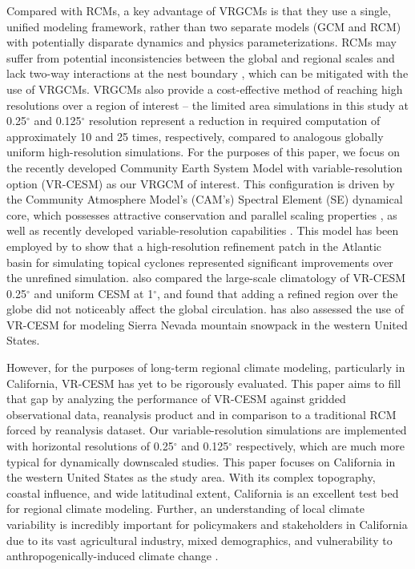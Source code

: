 \documentclass[draft,ms]{agutex}   %
\begin{document}
\begin{article}
Compared with RCMs, a key advantage of VRGCMs is that they use a single, unified modeling framework, rather than two separate models (GCM and RCM) with potentially disparate dynamics and physics parameterizations. RCMs may suffer from potential inconsistencies between the global and regional scales and lack two-way interactions at the nest boundary \citep{warner1997tutorial, mcdonald2003transparent, laprise2008challenging, mesinger2013limited}, which can be mitigated with the use of VRGCMs. VRGCMs also provide a cost-effective method of reaching high resolutions over a region of interest -- the limited area simulations in this study at 0.25$^\circ$ and 0.125$^\circ$ resolution represent a reduction in required computation of approximately 10 and 25 times, respectively, compared to analogous globally uniform high-resolution simulations. For the purposes of this paper, we focus on the recently developed Community Earth System Model with variable-resolution option (VR-CESM) as our VRGCM of interest. This configuration is driven by the Community Atmosphere Model's (CAM's) Spectral Element (SE) dynamical core, which possesses attractive conservation and parallel scaling properties \citep{dennis2011cam, taylor2011conservation}, as well as recently developed variable-resolution capabilities \citep{zarzycki2014aquaplanet, zarzycki2015experimental}. This model has been employed by \cite{zarzycki2014using} to show that a high-resolution refinement patch in the Atlantic basin for simulating topical cyclones represented significant improvements over the unrefined simulation. \cite{zarzycki2015effects} also compared the large-scale climatology of VR-CESM 0.25$^\circ$ and uniform CESM at 1$^\circ$, and found that adding a refined region over the globe did not noticeably affect the global circulation. \cite{Rhoades2015Characterizing} has also assessed the use of VR-CESM for modeling Sierra Nevada mountain snowpack in the western United States.


However, for the purposes of long-term regional climate modeling, particularly in California, VR-CESM has yet to be rigorously evaluated. This paper aims to fill that gap by analyzing the performance of VR-CESM against gridded observational data, reanalysis product and in comparison to a traditional RCM forced by reanalysis dataset. Our variable-resolution simulations are implemented with horizontal resolutions of 0.25$^\circ$ and 0.125$^\circ$ respectively, which are much more typical for dynamically downscaled studies. This paper focuses on California in the western United States as the study area. With its complex topography, coastal influence, and wide latitudinal extent, California is an excellent test bed for regional climate modeling. Further, an understanding of local climate variability is incredibly important for policymakers and stakeholders in California due to its vast agricultural industry, mixed demographics, and vulnerability to anthropogenically-induced climate change \citep{hayhoe2004emissions, cayan2008overview}. 



\end{article}
\end{document}

